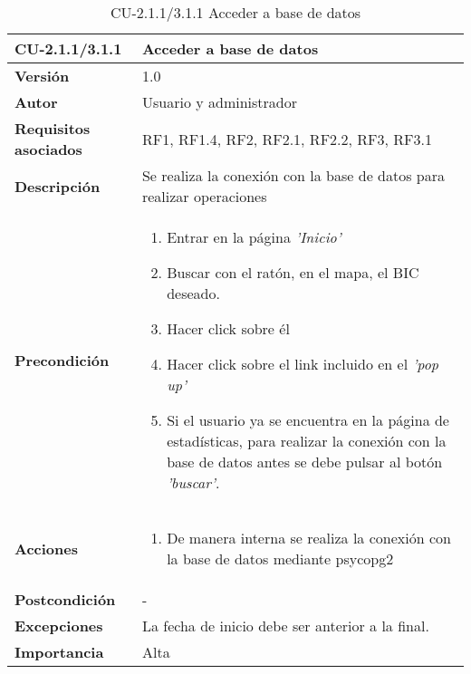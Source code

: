 \begin{table}[h!]
	\centering
	\begin{tabularx}{\linewidth}{ p{} p{} }
		\toprule
		\textbf{CU-2.1.1/3.1.1}    & \textbf{Acceder a base de datos}\\
		\toprule
		\textbf{Versión}              & 1.0    \\
		\textbf{Autor}                & Usuario y administrador \\
		\textbf{Requisitos asociados} & RF1, RF1.4, RF2, RF2.1, RF2.2, RF3, RF3.1\\
		\textbf{Descripción}          & Se realiza la conexión con la base de datos para realizar operaciones  \\
        \textbf{Precondición}         & 
        \begin{enumerate}
			\def\labelenumi{\arabic{enumi}.}
			\tightlist
			\item Entrar en la página \textit{'Inicio'}
			\item Buscar con el ratón, en el mapa, el BIC deseado.
            \item Hacer click sobre él
            \item Hacer click sobre el link incluido en el \textit{'pop up'} 
            \item Si el usuario ya se encuentra en la página de estadísticas, para realizar la conexión con la base de datos antes se debe pulsar al botón \textit{'buscar'}.
            
		\end{enumerate}\\
		
		\textbf{Acciones}             &
		\begin{enumerate}
			\def\labelenumi{\arabic{enumi}.}
			\tightlist
			\item De manera interna se realiza la conexión con la base de datos mediante psycopg2
            
		\end{enumerate}\\
		\textbf{Postcondición}        &  - \\
		\textbf{Excepciones}          &  La fecha de inicio debe ser anterior a la final.\\
		\textbf{Importancia}          & Alta \\
		\bottomrule
	\end{tabularx}
	\caption{CU-2.1.1/3.1.1 Acceder a base de datos}
\end{table}

